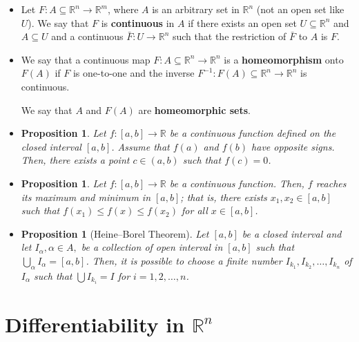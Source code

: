 \documentclass[10pt]{article}
\newtheorem{proposition}[lemma]{Proposition}
\newcommand{\ra}{\rightarrow}
\newcommand{\Real}{\mathbb{R}}
\begin{document}
\begin{itemize}
    \item Let $F: A \subseteq \Real^n \ra \Real^m$, where $A$ is an arbitrary set in $\Real^n$ (not an open set like $U$). We say that $F$ is {\bf continuous} in $A$ if there exists an open set $U \subseteq \Real^n$ and $A \subseteq U$ and a continuous $\bar F : U \ra \Real^n$ such that the restriction of $\bar F$ to $A$ is $F$.

    \item We say that a continuous map $F: A \subseteq \Real^n \ra \Real^n$ is a {\bf homeomorphism} onto $F(A)$ if $F$ is one-to-one and the inverse $F^{-1}: F(A) \subseteq \Real^n \ra \Real^n$ is continuous. 

    We say that $A$ and $F(A)$ are {\bf homeomorphic sets}.

    \item \begin{proposition}
      Let $f : [a,b] \ra \Real$ be a continuous function defined on the closed interval $[a,b]$. Assume that $f(a)$ and $f(b)$ have opposite signs. Then, there exists a point $c \in (a,b)$ such that $f(c) = 0$.
    \end{proposition}

    \item \begin{proposition}
      Let $f : [a,b] \ra \Real$ be a continuous function. Then, $f$ reaches its maximum and minimum in $[a,b]$; that is, there exists $x_1, x_2 \in [a,b]$ such that $f(x_1) \leq f(x) \leq f(x_2)$ for all $x \in [a,b]$.
    \end{proposition}

    \item \begin{proposition}[Heine--Borel Theorem]
      Let $[a,b]$ be a closed interval and let $I_\alpha, \alpha \in A,$ be a collection of open interval in $[a,b]$ such that $\bigcup_\alpha I_\alpha = [a,b]$. Then, it is possible to choose a finite number $I_{k_1}, I_{k_2}, \dotsc, I_{k_n}$ of $I_\alpha$ such that $\bigcup I_{k_i} = I$ for $i = 1, 2, \dotsc, n$.
    \end{proposition}
  \end{itemize}  

  \section{Differentiability in $\Real^n$} %
  \label{sec:differentiability_in_}
  
\end{document}
